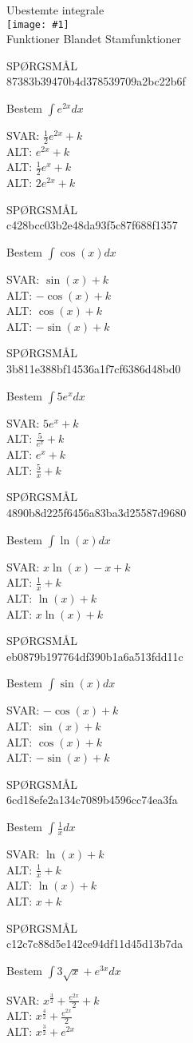 \documentclass[]{article}
\newcounter{spgcounter}
\newenvironment{question}[2]{\addtocounter{spgcounter}{1} SPØRGSMÅL \thespgcounter\\}{\hspace{50px}}
\newcommand{\name}[1]{{\huge #1}\\}
\newcommand{\tag}[1]{#1}
\newcommand{\cover}[1]{\texttt{[image: \#1]}\\}
\newcommand{\answer}[1]{{\color{green} SVAR: #1}\\}
\newcommand{\alt}[1]{{\color{red} ALT: #1}\\}
\begin{document}
\name{Ubestemte integrale}
\cover{sinintegral.png}
\tag{Funktioner}
\tag{Blandet}
\tag{Stamfunktioner}

\begin{question}{multi}\id{87383b39470b4d378539709a2bc22b6f}

Bestem $\int{e^{2x}} dx$

\answer{$\frac{1}{2}e^{2x} + k$}
\alt{$e^{2x} + k$}
\alt{$\frac{1}{2}e^{x} + k$}
\alt{$2e^{2x} + k$}

\end{question}

\begin{question}{multi}\id{c428bcc03b2e48da93f5c87f688f1357}

Bestem $\int{\cos(x)} dx$

\answer{$\sin(x) + k$}
\alt{$-\cos(x) + k$}
\alt{$\cos(x) + k$}
\alt{$-\sin(x) + k$}

\end{question}

\begin{question}{multi}\id{3b811e388bf14536a1f7cf6386d48bd0}

Bestem $\int{5e^x} dx$

\answer{$5e^x + k$}
\alt{$\frac{5}{e^x} + k$}
\alt{$e^x + k$}
\alt{$\frac{5}{x} + k$}

\end{question}

\begin{question}{multi}\id{4890b8d225f6456a83ba3d25587d9680}

Bestem $\int{\ln(x)} dx$

\answer{$x\ln(x) - x + k$}
\alt{$\frac{1}{x} + k$}
\alt{$\ln(x) + k$}
\alt{$x\ln(x) + k$}

\end{question}

\begin{question}{multi}\id{eb0879b197764df390b1a6a513fdd11c}

Bestem $\int{\sin(x)} dx$

\answer{$-\cos(x) + k$}
\alt{$\sin(x) + k$}
\alt{$\cos(x) + k$}
\alt{$-\sin(x) + k$}

\end{question}

\begin{question}{multi}\id{6cd18efe2a134c7089b4596cc74ea3fa}

Bestem $\int \frac{1}{x} dx $

\answer{$\ln(x) + k$}
\alt{$\frac{1}{x} + k$}
\alt{$\ln(x) + k$}
\alt{$x + k$}

\end{question}

\begin{question}{multi}\id{c12c7c88d5e142ce94df11d45d13b7da}

Bestem $\int 3 \sqrt{x} + e^{3 x} dx$
    
\answer{$x^{\frac{3}{2}} + \frac{e^{2x}}{2} + k$}
\alt{$x^{\frac{4}{2}} + \frac{e^{2x}}{2}$}
\alt{$x^{\frac{3}{2}} + e^{2x}$}

\end{question}
\end{document}

